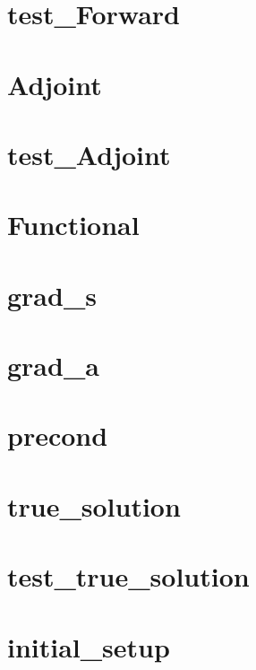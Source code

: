 \documentclass[letterpaper, 10pt, draft]{amsart}
\theoremstyle{definition}
\theoremstyle{remark}
\begin{document}
\section{test\_Forward}\label{sec:code-listing-test-forward}
{\small

}

\section{Adjoint}\label{sec:code-listing-adjoint}
{\small

}

\section{test\_Adjoint}\label{sec:code-listing-test-adjoint}
{\small

}

\section{Functional}\label{sec:code-listing-functional}
{\small

}

\section{grad\_s}\label{sec:code-listing-grad-s}
{\small

}

\section{grad\_a}\label{sec:code-listing-grad-a}
{\small

}

\section{precond}\label{sec:code-listing-precond}
{\small

}

\section{true\_solution}\label{sec:code-listing-true-solution}
{\small

}

\section{test\_true\_solution}\label{sec:code-listing-test-true-solution}
{\small

}

\section{initial\_setup}\label{sec:code-listing-initial-setup}
{\small

}



\end{document}
